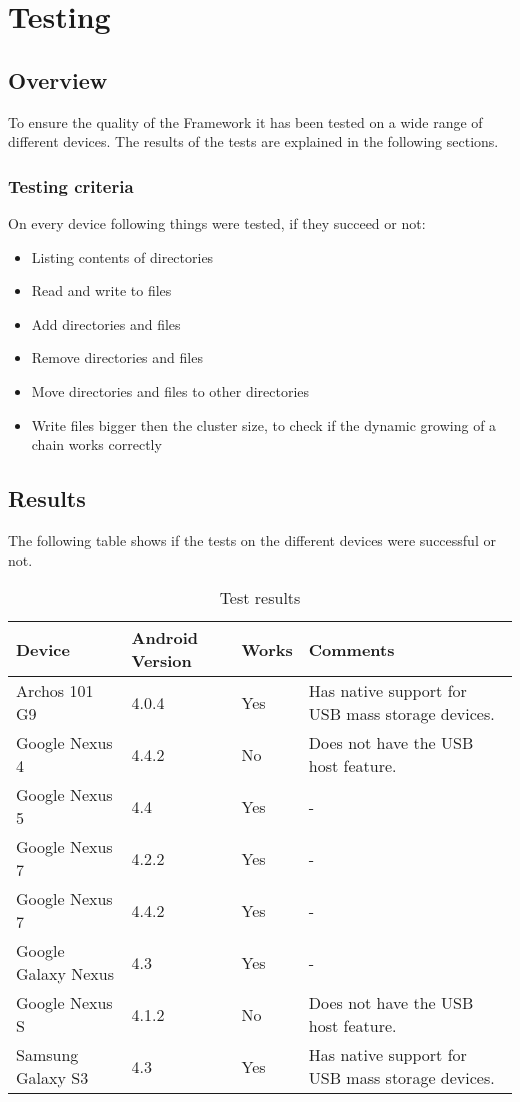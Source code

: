 \chapter{Testing}

\section{Overview}

To ensure the quality of the Framework it has been tested on a wide range of different devices. The results of the tests are explained in the following sections.

\subsection{Testing criteria}

On every device following things were tested, if they succeed or not:

\begin{itemize}
\item Listing contents of directories
\item Read and write to files
\item Add directories and files
\item Remove directories and files
\item Move directories and files to other directories
\item Write files bigger then the cluster size, to check if the dynamic growing of a chain works correctly
\end{itemize}

\section{Results}

The following table shows if the tests on the different devices were successful or not.

\begin{table}[ht]
\caption{Test results}
\centering
\begin{tabular}{|l|l|l|p{7cm}|}
\hline\hline
\textbf{Device} & \textbf{Android Version} & \textbf{Works} & \textbf{Comments} \\ \hline
Archos 101 G9 & 4.0.4 & Yes & Has native support for USB mass storage devices. \\ \hline
Google Nexus 4 & 4.4.2 & No & Does not have the USB host feature. \\ \hline
Google Nexus 5 & 4.4 & Yes & - \\ \hline
Google Nexus 7 & 4.2.2 & Yes & - \\ \hline
Google Nexus 7 & 4.4.2 & Yes & - \\ \hline
Google Galaxy Nexus & 4.3 & Yes & - \\ \hline
Google Nexus S & 4.1.2 & No & Does not have the USB host feature. \\ \hline
Samsung Galaxy S3 & 4.3 & Yes & Has native support for USB mass storage devices. \\ \hline
\end{tabular}
\label{table:test_results}
\end{table}


